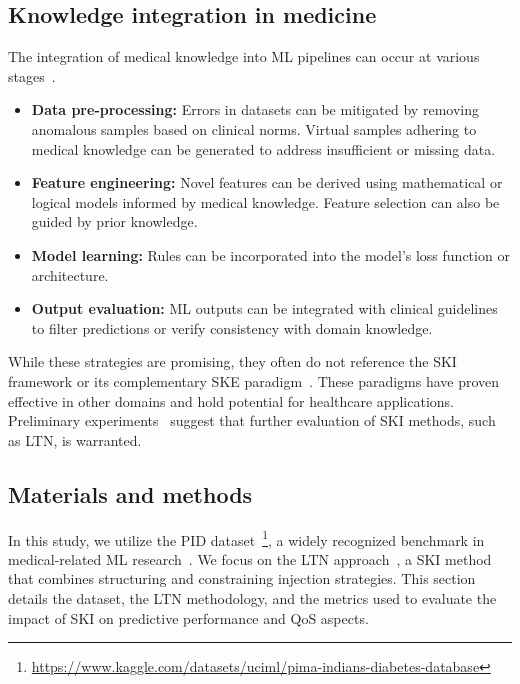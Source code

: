 \subsection{Knowledge integration in medicine}
\label{subsec:knowledge-integration-in-medicine}

The integration of medical knowledge into \gls{ML} pipelines can occur at various stages~\cite{von2021informed,kierner2023taxonomy}.
%
\begin{itemize}
    \item \textbf{Data pre-processing:} Errors in datasets can be mitigated by removing anomalous samples based on clinical norms.
    Virtual samples adhering to medical knowledge can be generated to address insufficient or missing data.
    \item \textbf{Feature engineering:} Novel features can be derived using mathematical or logical models informed by medical knowledge.
    Feature selection can also be guided by prior knowledge.
    \item \textbf{Model learning:} Rules can be incorporated into the model's loss function or architecture.
    \item \textbf{Output evaluation:} \gls{ML} outputs can be integrated with clinical guidelines to filter predictions or verify consistency with domain knowledge.
\end{itemize}
%
While these strategies are promising, they often do not reference the \gls{SKI} framework or its complementary \gls{SKE} paradigm~\cite{DBLP:journals/csur/CiattoSAMO24}.
%
These paradigms have proven effective in other domains and hold potential for healthcare applications.
%
Preliminary experiments~\cite{sirocchiRuleML2024} suggest that further evaluation of \gls{SKI} methods, such as \gls{LTN}, is warranted.


\subsection{Materials and methods}
\label{subsec:materials-and-methods}
%
In this study, we utilize the \gls{PID} dataset~\footnote{\url{https://www.kaggle.com/datasets/uciml/pima-indians-diabetes-database}}, a widely recognized benchmark in medical-related \gls{ML} research~\cite{karegowda2011application,DBLP:journals/nca/ChangBXS23}.
%
We focus on the \gls{LTN} approach~\cite{BadreddineGSS22}, a \gls{SKI} method that combines structuring and constraining injection strategies.
%
This section details the dataset, the \gls{LTN} methodology, and the metrics used to evaluate the impact of \gls{SKI} on predictive performance and \gls{QoS} aspects.

